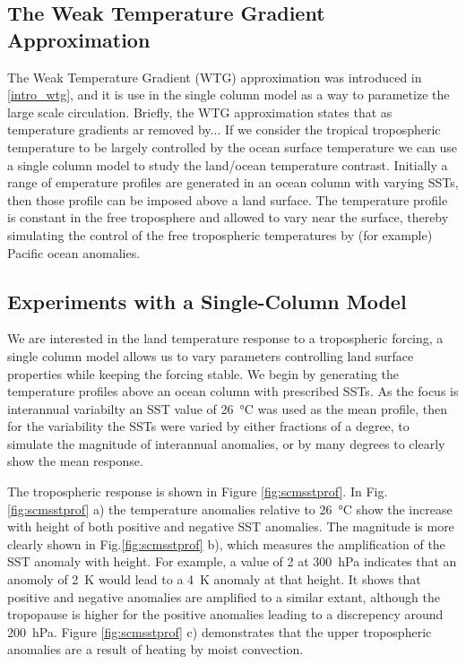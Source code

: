 \subsection{The Weak Temperature Gradient Approximation}
The Weak Temperature Gradient (WTG) approximation was introduced in 
\ref{intro_wtg}, and it is use in the single column model as a way to parametize 
the large scale circulation. Briefly, the WTG approximation states that as 
temperature gradients ar removed by... If we consider the tropical tropospheric 
temperature to be largely controlled by the ocean surface temperature we can use 
a single column model to study the land/ocean temperature contrast.  Initially a 
range of emperature profiles are generated in an ocean column with varying SSTs, 
then those profile can be imposed above a land surface.  The temperature profile 
is constant in the free troposphere and allowed to vary near the surface, 
thereby simulating the control of the free tropospheric temperatures by (for 
example) Pacific ocean anomalies.


\subsection{Experiments with a Single-Column Model}
\label{mech_scm}
We are interested in the land temperature response to a tropospheric forcing, a 
single column model allows us to vary parameters controlling land surface 
properties while keeping the forcing stable. We begin by generating the 
temperature profiles above an ocean column with prescribed SSTs. As the focus is 
interannual variabilty an SST value of \SI{26}{\degreeCelsius} was used as the 
mean profile, then for the variability the SSTs were varied by either fractions 
of a degree, to simulate the magnitude of interannual anomalies, or by many 
degrees to clearly show the mean response.

The tropospheric response is shown in Figure \ref{fig:scmsstprof}. In 
Fig.\ref{fig:scmsstprof} a) the temperature anomalies relative to 
\SI{26}{\degreeCelsius} show the increase with height of both positive and 
negative SST anomalies.  The magnitude is more clearly shown in 
Fig.\ref{fig:scmsstprof} b), which measures the amplification of the SST anomaly 
with height. For example, a value of 2 at \SI{300}{\hecto\pascal} indicates that 
an anomoly of \SI{2}{\kelvin} would lead to a \SI{4}{\kelvin} anomaly at that 
height.  It shows that positive and negative anomalies are amplified to a 
similar extant, although the tropopause is higher for the positive anomalies 
leading to a discrepency around \SI{200}{\hecto\pascal}. Figure 
\ref{fig:scmsstprof} c) demonstrates that the upper tropospheric anomalies are a 
result of heating by moist convection.


